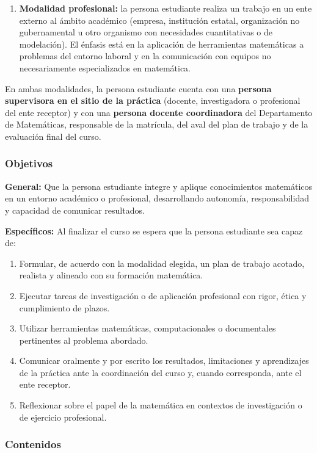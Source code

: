 \begin{refsection}
\begin{enumerate}
\item \textbf{Modalidad profesional:} la persona estudiante realiza un trabajo en un ente externo al ámbito académico (empresa, institución estatal, organización no gubernamental u otro organismo con necesidades cuantitativas o de modelación). El énfasis está en la aplicación de herramientas matemáticas a problemas del entorno laboral y en la comunicación con equipos no necesariamente especializados en matemática.
\end{enumerate}

En ambas modalidades, la persona estudiante cuenta con una \textbf{persona supervisora en el sitio de la práctica} (docente, investigadora o profesional del ente receptor) y con una \textbf{persona docente coordinadora} del Departamento de Matemáticas, responsable de la matrícula, del aval del plan de trabajo y de la evaluación final del curso.

\subsubsection*{Objetivos}

\textbf{General:} Que la persona estudiante integre y aplique conocimientos matemáticos en un entorno académico o profesional, desarrollando autonomía, responsabilidad y capacidad de comunicar resultados.

\textbf{Específicos:} Al finalizar el curso se espera que la persona estudiante sea capaz de:

\begin{enumerate}
\item Formular, de acuerdo con la modalidad elegida, un plan de trabajo acotado, realista y alineado con su formación matemática.
\item Ejecutar tareas de investigación o de aplicación profesional con rigor, ética y cumplimiento de plazos.
\item Utilizar herramientas matemáticas, computacionales o documentales pertinentes al problema abordado.
\item Comunicar oralmente y por escrito los resultados, limitaciones y aprendizajes de la práctica ante la coordinación del curso y, cuando corresponda, ante el ente receptor.
\item Reflexionar sobre el papel de la matemática en contextos de investigación o de ejercicio profesional.
\end{enumerate}

\subsubsection*{Contenidos}


\end{refsection}
